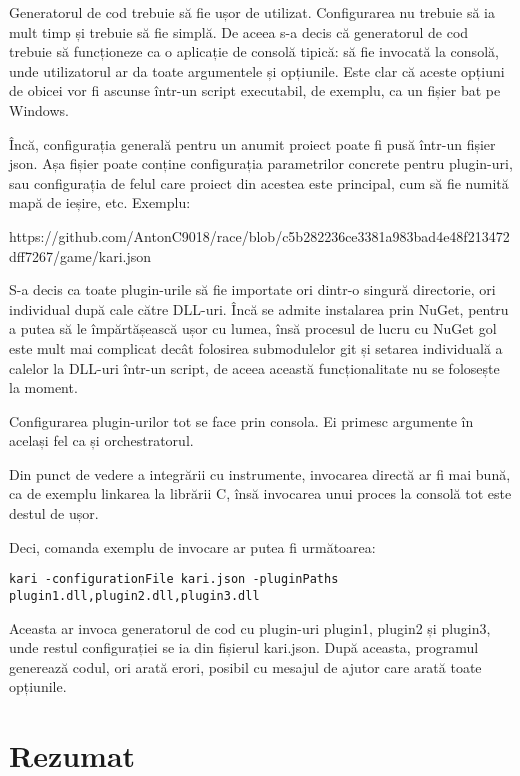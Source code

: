 \documentclass{report}
\begin{document}
Generatorul de cod trebuie să fie ușor de utilizat.
Configurarea nu trebuie să ia mult timp și trebuie să fie simplă.
De aceea s-a decis că generatorul de cod trebuie să funcționeze ca o aplicație de consolă tipică: să fie invocată la consolă, unde utilizatorul ar da toate argumentele și opțiunile.
Este clar că aceste opțiuni de obicei vor fi ascunse într-un script executabil, de exemplu, ca un fișier bat pe Windows.

Încă, configurația generală pentru un anumit proiect poate fi pusă într-un fișier json.
Așa fișier poate conține configurația parametrilor concrete pentru plugin-uri, sau configurația de felul care proiect din acestea este principal, cum să fie numită mapă de ieșire, etc. Exemplu:

https://github.com/AntonC9018/race/blob/c5b282236ce3381a983bad4e48f213472dff7267/game/kari.json


S-a decis ca toate plugin-urile să fie importate ori dintr-o singură directorie, ori individual după cale către DLL-uri.
Încă se admite instalarea prin NuGet, pentru a putea să le împărtășească ușor cu lumea, însă procesul de lucru cu NuGet gol este mult mai complicat decât folosirea submodulelor git și setarea individuală a calelor la DLL-uri într-un script, de aceea această funcționalitate nu se folosește la moment.

Configurarea plugin-urilor tot se face prin consola.
Ei primesc argumente în același fel ca și orchestratorul.

Din punct de vedere a integrării cu instrumente, invocarea directă ar fi mai bună, ca de exemplu linkarea la librării C, însă invocarea unui proces la consolă tot este destul de ușor.

Deci, comanda exemplu de invocare ar putea fi următoarea:

\begin{verbatim}
kari -configurationFile kari.json -pluginPaths plugin1.dll,plugin2.dll,plugin3.dll
\end{verbatim}

Aceasta ar invoca generatorul de cod cu plugin-uri plugin1, plugin2 și plugin3, unde restul configurației se ia din fișierul kari.json.
După aceasta, programul generează codul, ori arată erori, posibil cu mesajul de ajutor care arată toate opțiunile.


\section{Rezumat}
\end{document}
